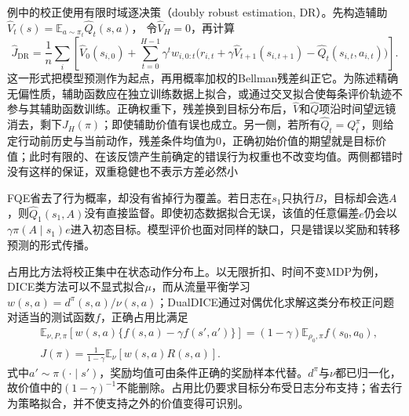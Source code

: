 例中的校正使用有限时域逐决策（doubly robust estimation, DR）。先构造辅助
$\widehat V_t(s)=\mathbb E_{a\sim\pi_t}\widehat Q_t(s,a)$，
令$\widehat V_H=0$，再计算
\begin{equation}
  \label{eq:rl-information-dr}
  \widehat J_{\mathrm{DR}}
  =\frac1n\sum_i\left[
    \widehat V_0(s_{i,0})
    +\sum_{t=0}^{H-1}\gamma^t w_{i,0:t}
       \bigl(r_{i,t}+\gamma\widehat V_{t+1}(s_{i,t+1})
                         -\widehat Q_t(s_{i,t},a_{i,t})\bigr)
    \right].
\end{equation}
这一形式把模型预测作为起点，再用概率加权的Bellman残差纠正它。为陈述精确无偏性质，辅助函数应在独立训练数据上拟合，或通过交叉拟合使每条评价轨迹不参与其辅助函数训练。正确权重下，残差换到目标分布后，$\widehat V$和$\widehat Q$项沿时间望远镜消去，剩下$J_H(\pi)$；即使辅助价值有误也成立。另一侧，若所有$\widehat Q_t=Q_t^\pi$，则给定行动前历史与当前动作，残差条件均值为0，正确初始价值的期望就是目标价值；此时有限的、在该反馈产生前确定的错误行为权重也不改变均值。两侧都错时没有这样的保证，双重稳健也不表示方差必然小

FQE省去了行为概率，却没有省掉行为覆盖。若日志在$s_1$只执行$B$，目标却会选$A$，则$\widehat Q_1(s_1,A)$没有直接监督。即使初态数据拟合无误，该值的任意偏差$e$仍会以$\gamma\pi(A\mid s_1)e$进入初态目标。模型评价也面对同样的缺口，只是错误以奖励和转移预测的形式传播。

占用比方法将校正集中在状态动作分布上。以无限折扣、时间不变MDP为例，DICE类方法可以不显式拟合$\mu$，而从流量平衡学习
$w(s,a)=d^\pi(s,a)/\nu(s,a)$；DualDICE通过对偶优化求解这类分布校正问题
对适当的测试函数$f$，正确占用比满足
\begin{align}
  \label{eq:rl-information-dice}
  &\mathbb E_{\nu,P,\pi}\!
       \left[w(s,a)\{f(s,a)-\gamma f(s',a')\}\right]
       =(1-\gamma)\mathbb E_{\rho_0,\pi}f(s_0,a_0),\nonumber\\
  &J(\pi)=\frac{1}{1-\gamma}\mathbb E_\nu[w(s,a)R(s,a)].
\end{align}
式中$a'\sim\pi(\cdot\mid s')$，奖励均值可由条件正确的奖励样本代替。$d^\pi$与$\nu$都已归一化，故价值中的$(1-\gamma)^{-1}$不能删除。占用比仍要求目标分布受日志分布支持；省去行为策略拟合，并不使支持之外的价值变得可识别。

